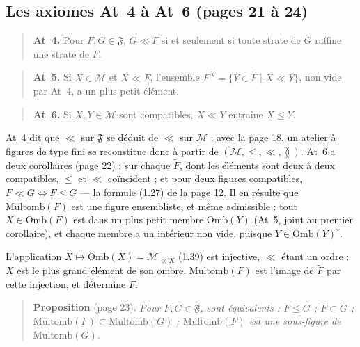\documentclass[11pt,a4paper]{article}
\begin{document}
\subsection*{Les axiomes At~4 à At~6 (pages 21 à 24)}

\begin{quote}
\textbf{At~4.} Pour $F, G \in \mathfrak{F}$, $G \ll F$ si et seulement si toute
strate de $G$ raffine une strate de $F$.
\end{quote}
\begin{quote}
\textbf{At~5.} Si $X \in \mathcal{M}$ et $X \ll F$, l'ensemble $F^{X} = \lbrace Y
\in \widetilde{F} \mid X \ll Y \rbrace$, non vide par At~4, a un plus petit
élément.
\end{quote}
\begin{quote}
\textbf{At~6.} Si $X, Y \in \mathcal{M}$ sont compatibles, $X \ll Y$ entraîne $X
\leq Y$.
\end{quote}

At~4 dit que $\ll$ sur $\mathfrak{F}$ se déduit de $\ll$ sur $\mathcal{M}$ ; avec
la page 18, un atelier à figures de type fini se reconstitue donc à partir de
$(\mathcal{M}, \leq, \ll, \between)$. At~6 a deux corollaires (page 22) : sur
chaque $\widetilde{F}$, dont les éléments sont deux à deux compatibles, $\leq$ et
$\ll$ coïncident ; et pour deux figures compatibles, $F \ll G \iff F \leq G$ ---
la formule (1.27) de la page 12. Il en résulte que $\mathrm{Multomb}(F)$ est une
figure ensembliste, et même admissible : tout $X \in \mathrm{Omb}(F)$ est dans
un plus petit membre $\mathrm{Omb}(Y)$ (At~5, joint au premier corollaire), et
chaque membre a un intérieur non vide, puisque $Y \in \mathrm{Omb}(Y)^{\circ}$.

L'application $X \mapsto \mathrm{Omb}(X) = \mathcal{M}_{\ll X}$ (1.39) est
injective, $\ll$ étant un ordre : $X$ est le plus grand élément de son ombre.
$\mathrm{Multomb}(F)$ est l'image de $\widetilde{F}$ par cette injection, et
détermine $F$.

\begin{quote}
\textbf{Proposition} (page 23). \emph{Pour $F, G \in \mathfrak{F}$, sont
équivalents : $F \leq G$ ; $\widetilde{F} \subset \widetilde{G}$ ;
$\mathrm{Multomb}(F) \subset \mathrm{Multomb}(G)$ ; $\mathrm{Multomb}(F)$ est une
sous-figure de $\mathrm{Multomb}(G)$.}
\end{quote}
\end{document}
